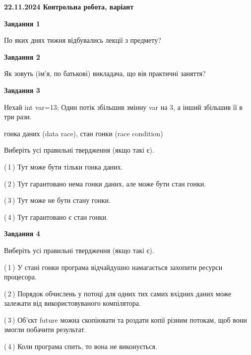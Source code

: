 \documentclass[12pt, ukrainian]{article}
\begin{document}
\begin {large}

\textbf{22.11.2024 Контрольна робота, варіант  }\par


{

\begin{center}
\textbf{Завдання 1}
\end{center}

По яких днях тижня відбувались лекції з предмету?


\begin{center}
\textbf{Завдання 2}
\end{center}

Як зовуть (ім'я, по батькові) викладача, що вів практичні заняття?


\begin{center}
\textbf{Завдання 3}
\end{center}

Нехай int var=13; Один потік збільшив змінну var на 3, а інший збільшив її в три рази.

гонка даних (data race), стан гонки (race condition)

Виберіть усі правильні твердження (якщо такі є).\par
\vspace{2mm}
(\,1\,) Тут може бути тільки гонка даних.%

(\,2\,) Тут гарантовано нема гонки даних, але може бути стан гонки.%

(\,3\,) Тут може не бути стану гонки.%

(\,4\,) Тут гарантовано є стан гонки.%


\begin{center}
\textbf{Завдання 4}
\end{center}

Виберіть усі правильні твердження (якщо такі є).\par
\vspace{2mm}

(\,1\,) У стані гонки програма відчайдушно намагається захопити ресурси процесора.%

(\,2\,) Порядок обчислень у потоці для одних тих самих вхідних даних може залежати від використовуваного компілятора.%

(\,3\,) Об’єкт future можна скопіювати та роздати копії різним потокам, щоб вони змогли побачити результат.%

(\,4\,) Коли програма спить, то вона не виконується.%


}
\end{large}
\end{document}
